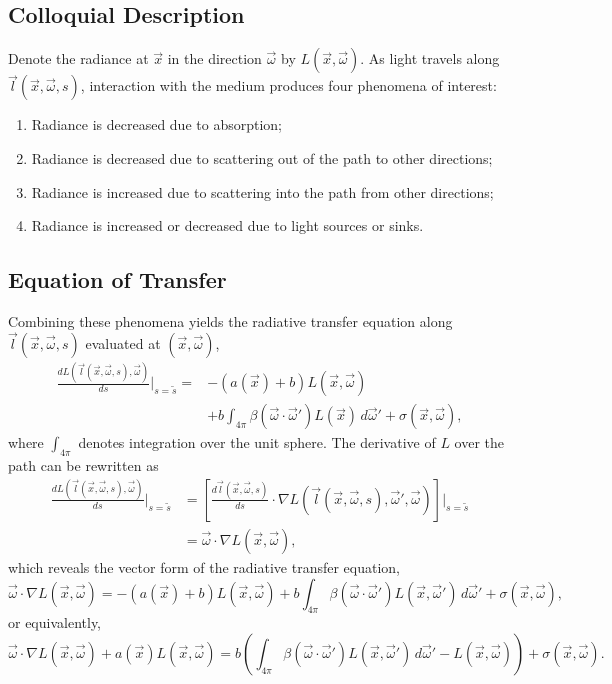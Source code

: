 \subsection{Colloquial Description}
Denote the radiance at $\vec{x}$ in the direction $\vec{\omega}$ by $L(\vec{x}, \vec{\omega})$.
As light travels along $\vec{l}(\vec{x}, \vec{\omega}, s)$, interaction with the
medium produces four phenomena of interest:
\begin{enumerate}
  \item Radiance is decreased due to absorption;
  \item Radiance is decreased due to scattering out of the path to other
    directions;
  \item Radiance is increased due to scattering into the path from other
      directions;
  \item Radiance is increased or decreased due to light sources or sinks.
\end{enumerate}

\subsection{Equation of Transfer}
Combining these phenomena yields the radiative transfer equation along
$\vec{l}(\vec{x}, \vec{\omega}, s)$ evaluated at $(\vec{x}, \vec{\omega})$,
\begin{align}
  \label{eqn:rte1d}
  \frac{dL\left(\vec{l}(\vec{x}, \vec{\omega}, s), \vec{\omega}\right)}{ds}\Bigg|_{s=\tilde{s}}
  = &-(a(\vec{x}) + b)L(\vec{x}, \vec{\omega}) \nonumber \\
  &+ b \int_{4\pi} \beta(\vec{\omega}\cdot\vec{\omega}') L(\vec{x})\, d\vec{\omega}' + \sigma(\vec{x}, \vec{\omega}),
\end{align}
where $\int_{4\pi}$ denotes integration over the unit sphere.
The derivative of $L$ over the path can be rewritten as
\begin{align*}
  \frac{dL\left(\vec{l}(\vec{x}, \vec{\omega}, s), \vec{\omega}\right)}{ds}\Bigg|_{s=\tilde{s}}
    &= \left[\frac{d\vec{l}(\vec{x}, \vec{\omega}, s)}{ds} \cdot \nabla L(\vec{l}(\vec{x}, \vec{\omega}, s), \vec{\omega}', \vec{\omega})\right]\Bigg|_{s=\tilde{s}} \\
    &= \vec{\omega} \cdot \nabla L(\vec{x}, \vec{\omega}),
\end{align*}
which reveals the vector form of the radiative transfer equation,
\begin{equation*}
  \vec{\omega} \cdot \nabla L(\vec{x}, \vec{\omega})
  = -(a(\vec{x}) + b)L(\vec{x}, \vec{\omega})
  + b \int_{4\pi} \beta(\vec{\omega}\cdot\vec{\omega}') L(\vec{x}, \vec{\omega}')\, d\vec{\omega}' + \sigma(\vec{x}, \vec{\omega}),
\end{equation*}
or equivalently,
\begin{equation}
  \vec{\omega} \cdot \nabla L(\vec{x}, \vec{\omega})
  + a(\vec{x})L(\vec{x}, \vec{\omega})
  = b \left(
    \int_{4\pi} \beta(\vec{\omega}\cdot\vec{\omega}') L(\vec{x}, \vec{\omega}')\, d\vec{\omega}'
    - L(\vec{x}, \vec{\omega})
  \right)+ \sigma(\vec{x}, \vec{\omega}).
  \label{eqn:rte}
\end{equation}


